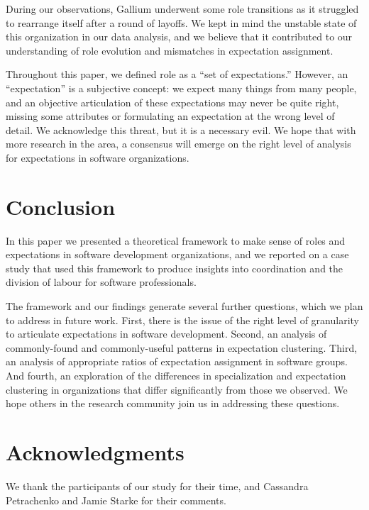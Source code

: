 \documentclass[10pt, conference, compsocconf]{IEEEtran}
\begin{document}
During our observations, Gallium underwent some role transitions as it struggled to rearrange itself after a round of layoffs. We kept in mind the unstable state of this organization in our data analysis, and we believe that it contributed to our understanding of role evolution and mismatches in expectation assignment.

Throughout this paper, we defined role as a ``set of expectations.'' However, an ``expectation'' is a subjective concept: we expect many things from many people, and an objective articulation of these expectations may never be quite right, missing some attributes or formulating an expectation at the wrong level of detail. We acknowledge this threat, but it is a necessary evil. We hope that with more research in the area, a consensus will emerge on the right level of analysis for expectations in software organizations.




\section{Conclusion}

In this paper we presented a theoretical framework to make sense of roles and expectations in software development organizations, and we reported on a case study that used this framework to produce insights into coordination and the division of labour for software professionals.

The framework and our findings generate several further questions, which we plan to address in future work. First, there is the issue of the right level of granularity to articulate expectations in software development. Second, an analysis of commonly-found and commonly-useful patterns in expectation clustering. Third, an analysis of  appropriate ratios of expectation assignment in software groups. And fourth, an exploration of the differences in specialization and expectation clustering in organizations that differ significantly from those we observed. We hope others in the research community join us in addressing these questions.




\section*{Acknowledgments}

We thank the participants of our study for their time, and Cassandra Petrachenko and Jamie Starke for their comments.



\end{document}
